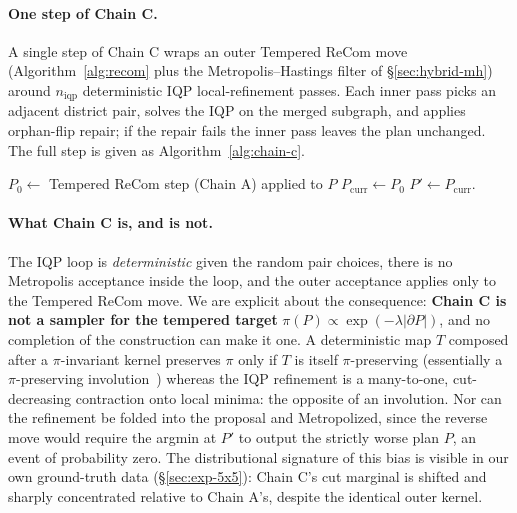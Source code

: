 \documentclass[11pt]{article}
\begin{document}
\paragraph{One step of Chain C.}\label{sec:chain-c-step}
A single step of Chain C wraps an outer Tempered ReCom move
(Algorithm~\ref{alg:recom} plus the Metropolis--Hastings filter of
\S\ref{sec:hybrid-mh}) around $n_{\mathrm{iqp}}$ deterministic
IQP local-refinement passes. Each inner pass picks an adjacent district
pair, solves the IQP on the merged subgraph, and applies orphan-flip
repair; if the repair fails the inner pass leaves the plan unchanged.
The full step is given as Algorithm~\ref{alg:chain-c}.

\begin{algorithm}[H]
\caption{One step of Chain C}\label{alg:chain-c}
$P_0 \gets $ Tempered ReCom step (Chain A) applied to $P$\;
$P_{\mathrm{curr}} \gets P_0$\;
\Return $P' \gets P_{\mathrm{curr}}$.
\end{algorithm}

\paragraph{What Chain C is, and is not.}\label{sec:chain-c-honest}
The IQP loop is \emph{deterministic} given the random pair choices, there is no Metropolis acceptance inside the loop, and the outer
acceptance applies only to the Tempered ReCom move. We are explicit
about the consequence: \textbf{Chain C is not a sampler for the
tempered target} $\pi(P) \propto \exp(-\lambda|\partial P|)$, and no
completion of the construction can make it one. A deterministic map
$T$ composed after a $\pi$-invariant kernel preserves $\pi$ only if
$T$ is itself $\pi$-preserving (essentially a $\pi$-preserving
involution~\cite{tierney1998note}) whereas the IQP refinement is a
many-to-one, cut-decreasing contraction onto local minima: the
opposite of an involution. Nor can the refinement be folded into the
proposal and Metropolized, since the reverse move would require the
argmin at $P'$ to output the strictly worse plan $P$, an event of
probability zero. The distributional signature of this bias is visible
in our own ground-truth data (\S\ref{sec:exp-5x5}): Chain C's cut
marginal is shifted and sharply concentrated relative to Chain A's,
despite the identical outer kernel.
\end{document}
